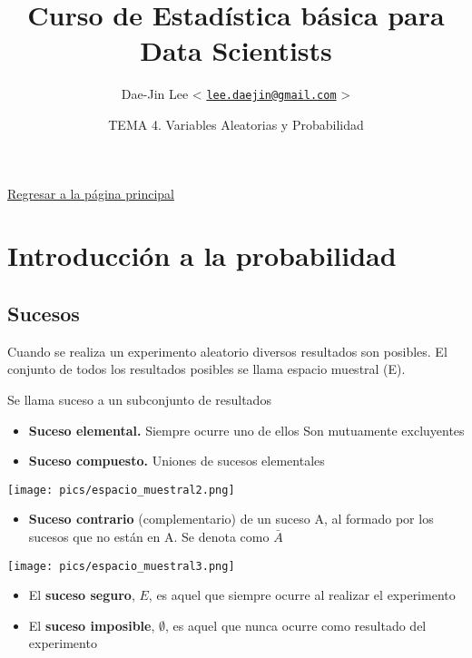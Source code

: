 \documentclass[]{article}
\title{\textbf{Curso de Estadística básica para Data Scientists}}
\author{Dae-Jin Lee \textless{}
\href{mailto:lee.daejin@gmail.com}{\nolinkurl{lee.daejin@gmail.com}}
\textgreater{}}
\date{TEMA 4. Variables Aleatorias y Probabilidad}
\def\tightlist{}
\numberwithin{equation}{section}
\begin{document}
\maketitle

{
\hypersetup{linkcolor=black}
\setcounter{tocdepth}{2}
\tableofcontents
}
\newpage

\href{https://idaejin.github.io/bcam-courses/R/datahack/}{Regresar a la
página principal}

\section{Introducción a la
probabilidad}\label{introduccion-a-la-probabilidad}

\subsection{Sucesos}\label{sucesos}

Cuando se realiza un experimento aleatorio diversos resultados son
posibles. El conjunto de todos los resultados posibles se llama espacio
muestral (E).

Se llama suceso a un subconjunto de resultados

\begin{itemize}
\item
  \textbf{Suceso elemental.} Siempre ocurre uno de ellos Son mutuamente
  excluyentes
\item
  \textbf{Suceso compuesto.} Uniones de sucesos elementales
\end{itemize}

\texttt{[image: pics/espacio\_muestral2.png]}

\begin{itemize}
\tightlist
\item
  \textbf{Suceso contrario} (complementario) de un suceso A, al formado
  por los sucesos que no están en A. Se denota como \(\bar{A}\)
\end{itemize}

\texttt{[image: pics/espacio\_muestral3.png]}

\begin{itemize}
\item
  El \textbf{suceso seguro}, \(E\), es aquel que siempre ocurre al
  realizar el experimento
\item
  El \textbf{suceso imposible}, \(\emptyset\), es aquel que nunca ocurre
  como resultado del experimento
\end{itemize}
\end{document}
